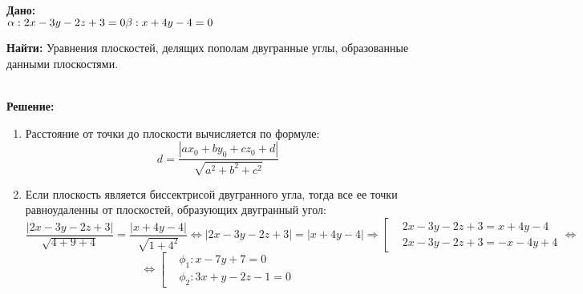\documentclass{article}
\begin{document}
\begin{minipage}[t]{0.45\textwidth}

\textbf{Дано:}\\ 
\begin{math}
  \alpha: 2x-3y-2z + 3 = 0\\ 
  \beta: x+4y - 4 = 0\\ 
\end{math}

\textbf{Найти: } Уравнения плоскостей, делящих пополам двугранные углы, образованные данными плоскостями.
\end{minipage}
\begin{minipage}[t]{0.45\textwidth}
  \vspace{-\baselineskip} %

\begin{center}
\end{center}
\end{minipage}
\\
\textbf{Решение:}
\begin{enumerate}
  \item Расстояние от точки до плоскости вычисляется по формуле:
    \[
      d = \frac{|ax_0+by_0 + cz_0 + d|}{\sqrt{a^2 + b^2 + c^2}}  
    \]
  \item Если плоскость является биссектрисой двугранного угла,
    тогда все ее точки равноудаленны от плоскостей, образующих двугранный угол:
    \[
      \frac{|2x - 3y - 2z + 3|}{\sqrt{4+9+4}} = \frac{|x+4y - 4|}{\sqrt{1+4^2}}
      \Leftrightarrow |2x - 3y - 2z + 3| = |x+4y-4| \Rightarrow 
      \left[
        \begin{aligned}
         &2x-3y-2z + 3 = x+4y-4\\ 
         &2x-3y-2z + 3 = -x-4y+4
        \end{aligned}
      \right. \Leftrightarrow 
    \]\[ \Leftrightarrow
 \left[
        \begin{aligned}
         &\phi_1: x-7y+7 = 0\\ 
         &\phi_2: 3x+y-2z - 1 = 0 
        \end{aligned}
      \right. 
    \]
\end{enumerate}
\end{document}
